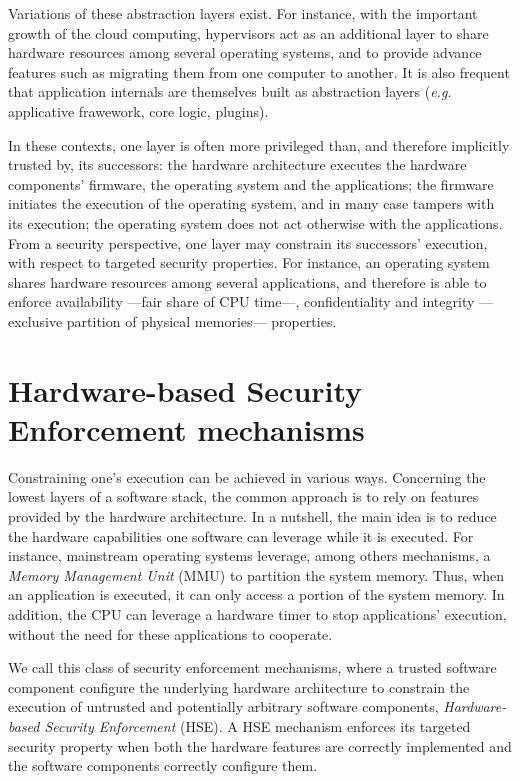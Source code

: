 Variations of these abstraction layers exist.
%
For instance, with the important growth of the cloud computing, hypervisors act
as an additional layer to share hardware resources among several operating
systems, and to provide advance features such as migrating them from one
computer to another. It is also frequent that application internals are
themselves built as abstraction layers (\emph{e.g.} applicative frawework, core
logic, plugins).

In these contexts, one layer is often more privileged than, and therefore
implicitly trusted by, its successors:
%
the hardware architecture executes the hardware components' firmware, the
operating system and the applications;
%
the firmware initiates the execution of the operating system, and in many case
tampers with its execution;
%
the operating system does not act otherwise with the applications.
%
From a security perspective, one layer may constrain its successors' execution,
with respect to targeted security properties.
%
For instance, an operating system shares hardware resources among several
applications, and therefore is able to enforce availability ---fair share of CPU
time---, confidentiality and integrity ---exclusive partition of physical
memories--- properties.

\section{Hardware-based Security Enforcement mechanisms}
%
Constraining one's execution can be achieved in various ways.
%
Concerning the lowest layers of a software stack, the common approach is to rely
on features provided by the hardware architecture.
%
In a nutshell, the main idea is to reduce the hardware capabilities one software
can leverage while it is executed.
%
For instance, mainstream operating systems leverage, among others mechanisms, a
\emph{Memory Management Unit} (MMU) to partition the system memory.
%
Thus, when an application is executed, it can only access a portion of the
system memory.
%
In addition, the CPU can leverage a hardware timer to stop applications'
execution, without the need for these applications to cooperate.

We call this class of security enforcement mechanisms, where a trusted software
component configure the underlying hardware architecture to constrain the
execution of untrusted and potentially arbitrary software components,
\emph{Hardware-based Security Enforcement} (HSE).
%
A HSE mechanism enforces its targeted security property when both the hardware
features are correctly implemented and the software components correctly
configure them.

